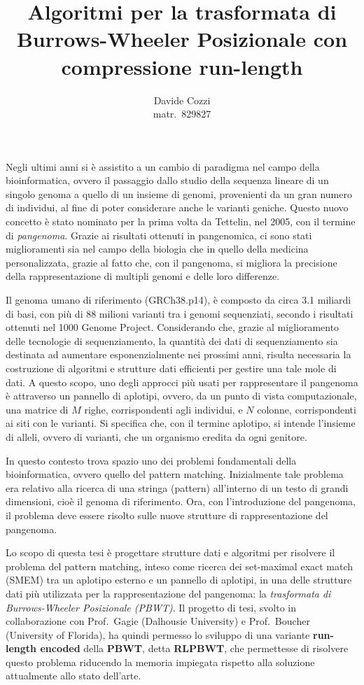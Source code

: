 \documentclass[a4paper,11pt, oneside,italian]{article}
\title{Algoritmi per la trasformata di Burrows-Wheeler
  Posizionale con compressione run-length}
\author{Davide Cozzi\\\smaller matr.~829827}
\date{}
\begin{document}
\maketitle
{}
\noindent
Negli ultimi anni si è assistito a un cambio di paradigma nel campo della
bioinformatica, ovvero il passaggio dallo studio della sequenza lineare di un
singolo genoma a quello di un insieme di genomi, provenienti da un gran numero
di individui, al fine di poter considerare anche le varianti
  geniche. Questo nuovo concetto è stato nominato per la prima volta da
Tettelin, nel 2005, con il termine di \textit{pangenoma}. Grazie ai risultati
ottenuti in pangenomica, ci sono stati miglioramenti sia nel 
campo della biologia che in quello della medicina personalizzata, grazie al
fatto che, con il pangenoma, si migliora la precisione della rappresentazione di
multipli genomi e delle loro differenze. 

Il genoma umano di riferimento (GRCh38.p14), è composto da circa
3.1 miliardi di basi, con più di 88 milioni 
varianti tra i genomi sequenziati, secondo i risultati ottenuti nel 1000 Genome
Project. Considerando che, grazie al
miglioramento delle tecnologie di sequenziamento, la quantità dei dati di
sequenziamento sia destinata 
ad aumentare esponenzialmente nei prossimi anni, risulta necessaria la
costruzione di algoritmi e   
strutture dati efficienti per gestire una tale mole di dati.
A questo scopo, uno degli approcci più usati per rappresentare il pangenoma è
attraverso un 
pannello di aplotipi, ovvero, da un punto di vista computazionale, una matrice
di $M$ 
righe, corrispondenti agli individui, e $N$ colonne, corrispondenti ai siti con
le varianti. Si specifica che, con il termine
aplotipo, si intende l'insieme di alleli, ovvero di varianti, che un organismo
eredita da ogni genitore.

In questo contesto trova spazio uno dei problemi fondamentali della
bioinformatica, ovvero quello del pattern matching. Inizialmente tale problema
era relativo alla ricerca di una stringa (pattern) all'interno di un testo di
grandi dimensioni, cioè il genoma di riferimento.
Ora, con l'introduzione del pangenoma, il problema deve essere risolto sulle
nuove strutture 
di rappresentazione del pangenoma.

Lo scopo di questa tesi è progettare strutture dati e algoritmi per risolvere il
problema del pattern 
matching, inteso come ricerca dei set-maximal exact match (SMEM) tra un aplotipo
esterno e un pannello di aplotipi, in una delle 
strutture dati più utilizzata per la rappresentazione del pangenoma: la
\textit{trasformata di Burrows-Wheeler 
  Posizionale (PBWT)}. Il progetto di tesi, svolto in collaborazione con
Prof.~Gagie (Dalhousie University) e Prof.~Boucher 
(University of Florida), ha quindi permesso lo sviluppo di una variante
\textbf{run-length encoded} della \textbf{PBWT}, detta \textbf{RLPBWT}, che
permettesse di risolvere questo problema riducendo la memoria impiegata rispetto
alla soluzione attualmente allo stato dell'arte.
\end{document}
